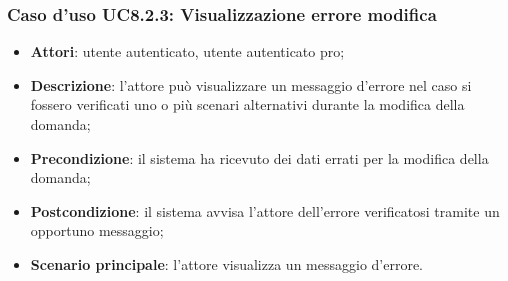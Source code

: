 	\subsubsection{Caso d'uso UC8.2.3: Visualizzazione errore modifica}
	\begin{itemize}
		\item
			\textbf{Attori}: utente autenticato, utente autenticato pro;
		\item
			\textbf{Descrizione}: l'attore può visualizzare un messaggio d'errore nel caso si fossero verificati uno o più scenari alternativi durante la modifica della domanda;
		\item		
			\textbf{Precondizione}: il sistema ha ricevuto dei dati errati per la modifica della domanda;
		\item
			\textbf{Postcondizione}: il sistema avvisa l'attore dell'errore verificatosi tramite un opportuno messaggio;
		\item
			\textbf{Scenario principale}: l'attore visualizza un messaggio d'errore.	
	\end{itemize}	